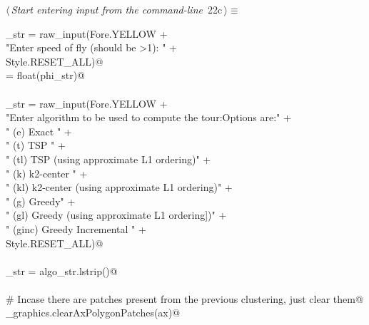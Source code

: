 \documentclass[11.5pt]{report}
\begin{document}
\vspace{-0.8cm}\newchunk 
\begin{flushleft} \small\label{scrap17}\raggedright\small
{} $\langle\,${\itshape Start entering input from the command-line}\nobreak\ {\footnotesize {22c}}$\,\rangle\equiv$
\vspace{-1ex}
\begin{list}{}{} \item
\mbox{}\verb@phi_str = raw_input(Fore.YELLOW + \@\\
\mbox{}\verb@          "Enter speed of fly (should be >1): " +\@\\
\mbox{}\verb@           Style.RESET_ALL)@\\
\mbox{}\verb@phi = float(phi_str)@\\
\mbox{}\verb@@\\
\mbox{}\verb@algo_str = raw_input(Fore.YELLOW + \@\\
\mbox{}\verb@          "Enter algorithm to be used to compute the tour:\n Options are:\n" +\@\\
\mbox{}\verb@        "  (e)   Exact \n"                                   +\@\\
\mbox{}\verb@        "  (t)   TSP   \n"                                   +\@\\
\mbox{}\verb@        "  (tl)  TSP   (using approximate L1 ordering)\n"    +\@\\
\mbox{}\verb@        "  (k)   k2-center   \n"                             +\@\\
\mbox{}\verb@        "  (kl)  k2-center (using approximate L1 ordering)\n"  +\@\\
\mbox{}\verb@        "  (g)   Greedy\n"                                   +\@\\
\mbox{}\verb@        "  (gl)  Greedy (using approximate L1 ordering])\n"  +\@\\
\mbox{}\verb@        "  (ginc) Greedy Incremental  "  +\@\\
\mbox{}\verb@        Style.RESET_ALL)@\\
\mbox{}\verb@@\\
\mbox{}\verb@algo_str = algo_str.lstrip()@\\
\mbox{}\verb@@\\
\mbox{}\verb@# Incase there are patches present from the previous clustering, just clear them@\\
\mbox{}\verb@utils_graphics.clearAxPolygonPatches(ax)@\\
\mbox{}\verb@@\\

\end{list}
\end{flushleft}
\end{document}
